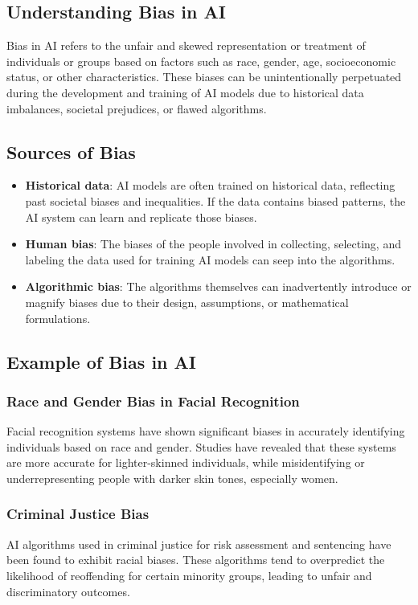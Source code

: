 \documentclass[12pt,a4paper,openright,twoside]{book}
\begin{document}
\subsection{Understanding Bias in AI}
Bias in AI refers to the unfair and skewed representation or treatment of individuals or groups based on factors such as race, gender, age, socioeconomic status, or other characteristics. These biases can be unintentionally perpetuated during the development and training of AI models due to historical data imbalances, societal prejudices, or flawed algorithms.

\subsection{Sources of Bias}
\begin{itemize}
    \item \textbf{Historical data}: AI models are often trained on historical data, reflecting past societal biases and inequalities. If the data contains biased patterns, the AI system can learn and replicate those biases.
    \item \textbf{Human bias}: The biases of the people involved in collecting, selecting, and labeling the data used for training AI models can seep into the algorithms.
    \item \textbf{Algorithmic bias}: The algorithms themselves can inadvertently introduce or magnify biases due to their design, assumptions, or mathematical formulations.
\end{itemize}

\subsection{Example of Bias in AI}
\subsubsection{Race and Gender Bias in Facial Recognition}
Facial recognition systems have shown significant biases in accurately identifying individuals based on race and gender. Studies have revealed that these systems are more accurate for lighter-skinned individuals, while misidentifying or underrepresenting people with darker skin tones, especially women.

\subsubsection{Criminal Justice Bias}
AI algorithms used in criminal justice for risk assessment and sentencing have been found to exhibit racial biases. These algorithms tend to overpredict the likelihood of reoffending for certain minority groups, leading to unfair and discriminatory outcomes.
\end{document}
